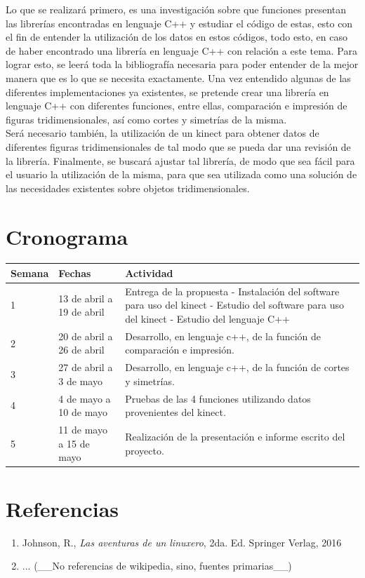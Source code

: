 \documentclass[letterpaper]{article}
\begin{document}
Lo que se realizará primero, es una investigación sobre que funciones presentan las librerías encontradas en lenguaje C++ y estudiar el código de estas,
esto con el fin de entender la utilización de los datos en estos códigos, todo esto, en caso de haber encontrado una librería en lenguaje C++ con relación a este tema.
Para lograr esto, se leerá toda la bibliografía necesaria para poder entender de la mejor manera que es lo que se necesita exactamente. Una vez
entendido algunas de las diferentes implementaciones ya existentes, se pretende crear una librería en lenguaje C++ con diferentes funciones, entre ellas,
comparación e impresión de figuras tridimensionales, así como cortes y simetrías de la misma. \\

Será necesario también, la utilización de un
kinect para obtener datos de diferentes figuras tridimensionales de tal modo que se pueda dar una revisión de la librería. Finalmente, se buscará ajustar tal librería,
de modo que sea fácil para el usuario la utilización de la misma, para que sea utilizada como una solución de las necesidades
existentes sobre objetos tridimensionales.\\


\section{Cronograma}


\begin{table}[h]


\begin{tabular}{l l l}
\toprule

\textbf{Semana} & \textbf{Fechas} & \textbf{Actividad}\\

\midrule
1 & 13 de abril a 19 de abril & Entrega de la propuesta - Instalación del
software para uso del kinect -
 Estudio del software para uso del kinect -
Estudio del lenguaje C++ \\
2 & 20 de abril a 26 de abril & Desarrollo, en lenguaje c++, de la función
de comparación e impresión. \\
3 & 27 de abril a 3 de mayo & Desarrollo, en lenguaje c++, de la función
de cortes y simetrías. \\
4 & 4 de mayo a 10 de mayo & Pruebas de las 4 funciones utilizando datos
provenientes del kinect. \\
5 & 11 de mayo a 15 de mayo & Realización de la presentación e informe
escrito del proyecto. \\
\bottomrule
\end{tabular}
\end{table}

\section{Referencias}

\begin{enumerate}
\item Johnson, R., \textit{Las aventuras de un linuxero}, 2da. Ed. Springer Verlag, 2016
\item ... (\_\_No referencias de wikipedia, sino, fuentes primarias\_\_)
\end{enumerate}
	
\end{document}

